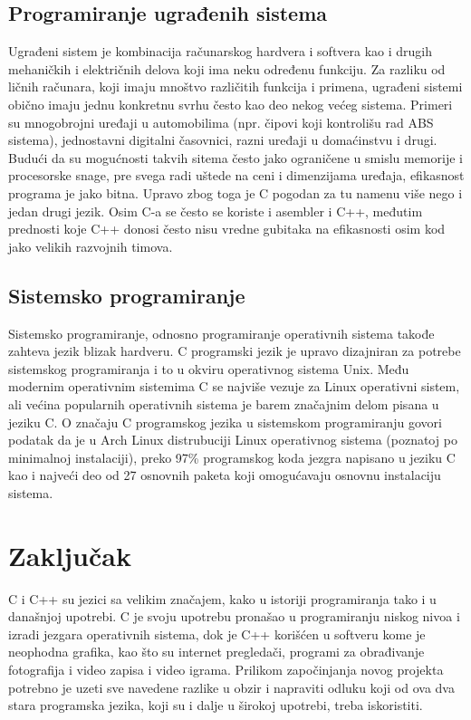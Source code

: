 \documentclass[a4paper]{article}
\begin{document}
{\subsection{Programiranje ugrađenih sistema}
Ugrađeni sistem je kombinacija računarskog hardvera i softvera kao i drugih mehaničkih i električnih
delova koji ima neku određenu funkciju. Za razliku od ličnih računara, koji imaju mnoštvo različitih funkcija i primena, ugrađeni sistemi obično imaju jednu konkretnu svrhu često kao deo nekog većeg sistema. Primeri su mnogobrojni uređaji u automobilima (npr. čipovi koji kontrolišu rad ABS sistema), jednostavni digitalni časovnici, razni uređaji u  domaćinstvu i drugi. Budući da su mogućnosti takvih sitema često jako ograničene u smislu memorije i procesorske snage, pre svega radi uštede na ceni i dimenzijama uređaja, efikasnost programa je jako bitna. Upravo zbog toga je C pogodan za tu namenu više nego i jedan drugi jezik. Osim C-a se često se koriste i asembler i C++, međutim prednosti koje C++ donosi često nisu vredne gubitaka na efikasnosti osim kod jako velikih razvojnih timova.

\subsection{Sistemsko programiranje}Sistemsko programiranje, odnosno programiranje operativnih sistema takođe zahteva jezik blizak hardveru. C programski jezik je upravo dizajniran za potrebe sistemskog programiranja i to u okviru operativnog sistema Unix. Među modernim operativnim sistemima C se najviše vezuje za Linux operativni sistem, ali većina popularnih operativnih sistema je barem značajnim delom pisana u jeziku C. O značaju C programskog jezika u sistemskom programiranju govori podatak da je u Arch Linux distrubuciji Linux operativnog sistema (poznatoj po minimalnoj instalaciji), preko 97\% programskog koda jezgra napisano u jeziku C kao i najveći deo od 27 osnovnih paketa koji omogućavaju osnovnu instalaciju sistema.

\section{Zaključak}
\label{sec:zakljucak}
C i C++ su jezici sa velikim značajem, kako u istoriji programiranja tako i u današnjoj upotrebi. C je svoju upotrebu pronašao u programiranju niskog nivoa i izradi jezgara operativnih sistema, dok je C++ korišćen u softveru kome je neophodna grafika, kao što su internet pregledači, programi za obrađivanje fotografija i video zapisa i video igrama. Prilikom započinjanja novog projekta potrebno je uzeti sve navedene razlike u obzir i napraviti odluku koji od ova dva stara programska jezika, koji su i dalje u širokoj upotrebi, treba iskoristiti.


}
\end{document}

